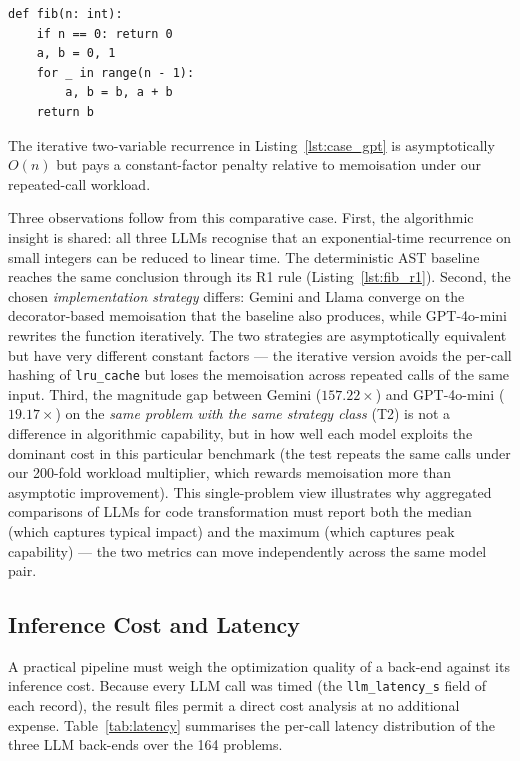 \documentclass[conference]{IEEEtran}
\begin{document}
\par\medskip\noindent
\begin{minipage}{\columnwidth}
\begin{lstlisting}[caption={GPT-4o-mini on \texttt{fib}: iterative (speedup $\mathbf{19.17\times}$).}, label={lst:case_gpt}]
def fib(n: int):
    if n == 0: return 0
    a, b = 0, 1
    for _ in range(n - 1):
        a, b = b, a + b
    return b
\end{lstlisting}
\end{minipage}\par\medskip

The iterative two-variable recurrence in Listing~\ref{lst:case_gpt} is asymptotically $O(n)$ but pays a constant-factor penalty relative to memoisation under our repeated-call workload.

Three observations follow from this comparative case. First, the algorithmic insight is shared: all three LLMs recognise that an exponential-time recurrence on small integers can be reduced to linear time. The deterministic AST baseline reaches the same conclusion through its R1 rule (Listing~\ref{lst:fib_r1}). Second, the chosen \emph{implementation strategy} differs: Gemini and Llama converge on the decorator-based memoisation that the baseline also produces, while GPT-4o-mini rewrites the function iteratively. The two strategies are asymptotically equivalent but have very different constant factors --- the iterative version avoids the per-call hashing of \texttt{lru\_cache} but loses the memoisation across repeated calls of the same input. Third, the magnitude gap between Gemini ($157.22\times$) and GPT-4o-mini ($19.17\times$) on the \emph{same problem with the same strategy class} (T2) is not a difference in algorithmic capability, but in how well each model exploits the dominant cost in this particular benchmark (the test repeats the same calls under our 200-fold workload multiplier, which rewards memoisation more than asymptotic improvement). This single-problem view illustrates why aggregated comparisons of LLMs for code transformation must report both the median (which captures typical impact) and the maximum (which captures peak capability) --- the two metrics can move independently across the same model pair.

\subsection{Inference Cost and Latency}
\label{sec:latency}

A practical pipeline must weigh the optimization quality of a back-end against its inference cost. Because every LLM call was timed (the \texttt{llm\_latency\_s} field of each record), the result files permit a direct cost analysis at no additional expense. Table~\ref{tab:latency} summarises the per-call latency distribution of the three LLM back-ends over the 164 problems.
\end{document}
